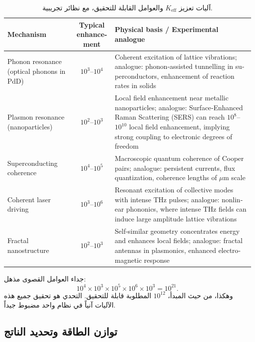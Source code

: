 \documentclass[11pt,a4paper]{article}
\newcommand{\Keff}{K_{\mathrm{eff}}}
\theoremstyle{remark}
\begin{document}
	\begin{table}[htbp]
		\begin{otherlanguage}{english}
			\centering
			\caption{Mechanisms for enhancing \(\Keff\) and achievable factors, with experimental analogues.}
			\label{tab:enhancement}
			\small
			\begin{tabularx}{\textwidth}{>{\raggedright\arraybackslash}p{3.2cm} c X}
				\toprule
				\textbf{Mechanism} & \textbf{Typical enhancement} & \textbf{Physical basis / Experimental analogue} \\
				\midrule
				Phonon resonance (optical phonons in PdD) & \(10^3\)–\(10^4\) & Coherent excitation of lattice vibrations; analogue: phonon‑assisted tunnelling in superconductors, enhancement of reaction rates in solids \cite{Storms2014, Tinkham2004} \\
				Plasmon resonance (nanoparticles) & \(10^2\)–\(10^3\) & Local field enhancement near metallic nanoparticles; analogue: Surface‑Enhanced Raman Scattering (SERS) can reach \(10^8\)–\(10^{10}\) local field enhancement, implying strong coupling to electronic degrees of freedom \cite{Maier2007, SERS} \\
				Superconducting coherence & \(10^4\)–\(10^5\) & Macroscopic quantum coherence of Cooper pairs; analogue: persistent currents, flux quantization, coherence lengths of \(\mu\)m scale \cite{Tinkham2004} \\
				Coherent laser driving & \(10^3\)–\(10^6\) & Resonant excitation of collective modes with intense THz pulses; analogue: nonlinear phononics, where intense THz fields can induce large amplitude lattice vibrations \cite{Kampfrath2011} \\
				Fractal nanostructure & \(10^2\)–\(10^3\) & Self‑similar geometry concentrates energy and enhances local fields; analogue: fractal antennas in plasmonics, enhanced electromagnetic response \cite{Mandelbrot1982, fractal-antenna} \\
				\bottomrule
			\end{tabularx}
		\end{otherlanguage}
		\caption{آليات تعزيز \(\Keff\) والعوامل القابلة للتحقيق، مع نظائر تجريبية.}
	\end{table}
	
	جداء العوامل القصوى مذهل:
	\[
	10^4 \times 10^3 \times 10^5 \times 10^6 \times 10^3 = 10^{21}.
	\]
	وهكذا، من حيث المبدأ، \(10^{12}\) المطلوبة قابلة للتحقيق. التحدي هو تحقيق جميع هذه الآليات آنياً في نظام واحد مضبوط جيداً.
	
	\subsection{توازن الطاقة وتحديد الناتج}
	
\end{document}
